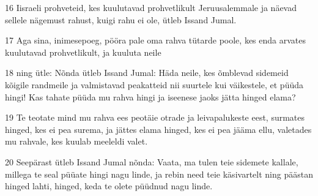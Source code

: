 \par 16 Iisraeli prohveteid, kes kuulutavad prohvetlikult Jeruusalemmale ja näevad sellele nägemust rahust, kuigi rahu ei ole, ütleb Issand Jumal.
\par 17 Aga sina, inimesepoeg, pööra pale oma rahva tütarde poole, kes enda arvates kuulutavad prohvetlikult, ja kuuluta neile
\par 18 ning ütle: Nõnda ütleb Issand Jumal: Häda neile, kes õmblevad sidemeid kõigile randmeile ja valmistavad peakatteid nii suurtele kui väikestele, et püüda hingi! Kas tahate püüda mu rahva hingi ja iseenese jaoks jätta hinged elama?
\par 19 Te teotate mind mu rahva ees peotäie otrade ja leivapalukeste eest, surmates hinged, kes ei pea surema, ja jättes elama hinged, kes ei pea jääma ellu, valetades mu rahvale, kes kuulab meeleldi valet.
\par 20 Seepärast ütleb Issand Jumal nõnda: Vaata, ma tulen teie sidemete kallale, millega te seal püüate hingi nagu linde, ja rebin need teie käsivartelt ning päästan hinged lahti, hinged, keda te olete püüdnud nagu linde.


